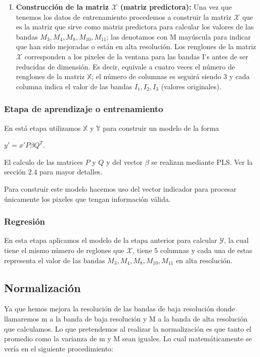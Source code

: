 \begin{enumerate}[I)]
\item \textbf{Construcción de la matriz $\mathcal{X}$ (matriz predictora):} Una vez que tenemos los datos de entrenamiento procedemos a construir la matriz $\mathcal{X}$ que es la matriz que sirve como matriz predictora para calcular los valores de las bandas  $M_{3}, M_{4}, M_{8}, M_{10}, M_{11}$; las denotamos con M mayúscula para indicar que han sido mejoradas o están en alta resolución. Los renglones de la matriz $\mathcal{X}$ corresponden a los pixeles de la ventana para las bandas I's antes de ser reducidas de dimensión. Es decir, equivale a cuatro veces el número de renglones de la matriz $\mathbb{X}$; el número de columnas es seguirá siendo 3 y cada columna indica el valor de las bandas $I_{1}, I_{2}, I_{3}$ (valores originales).
\end{enumerate}



\subsubsection{Etapa de aprendizaje o entrenamiento}

En está etapa utilizamos $\mathbb{X}$ y $\mathbb{Y}$ para construir un modelo de la forma 

\begin{center}
$y' = x'P\beta Q^{T}$.
\end{center}

El calculo de las matrices $P$ y $Q$ y del vector $\beta$ se realizan mediante PLS. Ver la sección 2.4 para mayor detalles. 

Para construir este modelo hacemos uso del vector indicador para procesar únicamente los pixeles que tengan información válida. 

\subsubsection{Regresión}

En esta etapa aplicamos el modelo de la etapa anterior para calcular $\mathcal{Y}$, la cual tiene el mismo número de reglones que $\mathcal{X}$, tiene 5 columnas y cada una de estas representa el valor de las bandas $M_{3}, M_{4}, M_{8}, M_{10}, M_{11}$ en alta resolución.

\subsection{Normalización}

Ya que hemos mejora la resolución de las bandas de baja resolución donde llamaremos m a la banda de baja resolución y M a la banda de alta resolución que calculamos. Lo que pretendemos al realizar la normalización es que tanto el promedio como la varianza de m y M sean iguales. Lo cual matemáticamente se vería en el siguiente procedimiento: 


